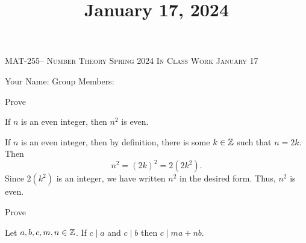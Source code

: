 \documentclass[handout]{ximera}
\title{January 17, 2024}
\begin{document}
\handoutAbstract
\maketitle
    \begin{center}%
        {\large \scshape MAT-255-- Number Theory \hfill Spring 2024 \hfill In Class Work January 17}%
    
        {\large
        Your Name: \hrulefill \quad Group Members:\hrulefill \quad \hrulefill
	    \par}%
  \end{center}%


\begin{br}
    Prove
        \begin{theorem}
            If $n$ is an even integer, then $n^2$ is even.
        \end{theorem}

        \begin{solution}
            If $n$ is an even integer, then by definition, there is some $k\in\mathbb Z$ such that $n=2k$. Then \[n^2=(2k)^2=2(2k^2).\] Since $2(k^2)$ is an integer, we have written $n^2$ in the desired form. Thus, $n^2$ is even.
        \end{solution}
\end{br}
\else
\fi


\begin{br}
    Prove
        \begin{theorem}%
            Let $a,b,c,m,n\in\mathbb Z$.
            If $c\mid a$ and $c\mid b$ then $c\mid ma+nb$.
        \end{theorem}
\end{br}
\end{document}
